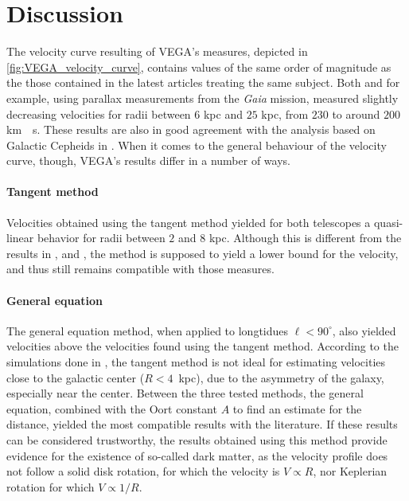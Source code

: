 \section{Discussion}
The velocity curve resulting of VEGA's measures, depicted in \autoref{fig:VEGA_velocity_curve}, contains values of the same order of magnitude as the those contained in the latest articles treating the same subject.
Both \cite{ou_dark_2024} and \cite{eilers_circular_2019} for example, using parallax measurements from the \emph{Gaia} mission, measured slightly decreasing velocities for radii between $6$ kpc and $25$ kpc, from $230$ to around $200$ \unit{km \per s}.
These results are also in good agreement with the analysis based on Galactic Cepheids in \cite{mroz_rotation_2019}.
When it comes to the general behaviour of the velocity curve, though, VEGA's results differ in a number of ways.

\paragraph{Tangent method} 
Velocities obtained using the tangent method yielded for both telescopes a quasi-linear behavior for radii between $2$ and $8$ kpc. Although this is different from the results in \cite{ou_dark_2024}, \cite{eilers_circular_2019} and \cite{mroz_rotation_2019}, the method is supposed to yield a lower bound for the velocity, and thus still remains compatible with those measures.

\paragraph{General equation}The general equation method, when applied to longtidues $\ell < 90^\circ$, also yielded velocities above the velocities found using the tangent method. According to the simulations done in \cite{chemin_incorrect_2015}, the tangent method is not ideal for estimating velocities close to the galactic center \mbox{($R < 4$ kpc)}, due to the asymmetry of the galaxy, especially near the center.
Between the three tested methods, the general equation, combined with the Oort constant $A$ to find an estimate for the distance, yielded the most compatible results with the literature. If these results can be considered trustworthy, the results obtained using this method provide evidence for the existence of so-called dark matter, as the velocity profile does not follow a solid disk rotation, for which the velocity is $V \propto R$, nor Keplerian rotation for which $V \propto 1/R$.

